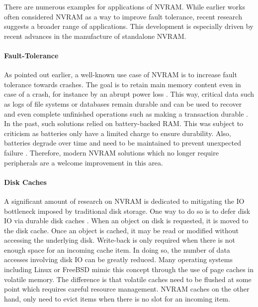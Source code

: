 There are numerous examples for applications of \ac{NVRAM}. While earlier works
often considered \ac{NVRAM} as a way to improve fault tolerance, recent research
suggests a broader range of applications. This development is especially driven
by recent advances in the manufacture of standalone \ac{NVRAM}.

\paragraph{Fault-Tolerance}

As pointed out earlier, a well-known use case of \ac{NVRAM} is to increase fault
tolerance towards crashes. The goal is to retain main memory content even in
case of a crash, for instance by an abrupt power loss \cite{molina1992main,
eich1986main}. This way, critical data such as logs of file systems or databases
remain durable and can be used to recover and even complete unfinished
operations such as making a transaction durable \cite{liskov1991replication,
chen1996rio}. In the past, such solutions relied on battery-backed \ac{RAM}.
This was subject to criticism as batteries only have a limited charge to ensure
durability. Also, batteries degrade over time and need to be maintained to
prevent unexpected failure \cite{molina1992main}. Therefore, modern \ac{NVRAM}
solutions which no longer require peripherals are a welcome improvement in this
area.

\paragraph{Disk Caches}

A significant amount of research on \ac{NVRAM} is dedicated to mitigating the
\ac{IO} bottleneck imposed by traditional disk storage. One way to do so is to
defer disk \ac{IO} via durable disk caches \cite{chen1996rio, wu1994envy}. When
an object on disk is requested, it is moved to the disk cache. Once an object is
cached, it may be read or modified without accessing the underlying disk.
Write-back is only required when there is not enough space for an incoming cache
item. In doing so, the number of data accesses involving disk \ac{IO} can be
greatly reduced. Many operating systems including Linux or FreeBSD mimic this
concept through the use of page caches in volatile memory. The difference is
that volatile caches need to be flushed at some point which requires careful
resource management. \ac{NVRAM} caches on the other hand, only need to evict
items when there is no slot for an incoming item.

